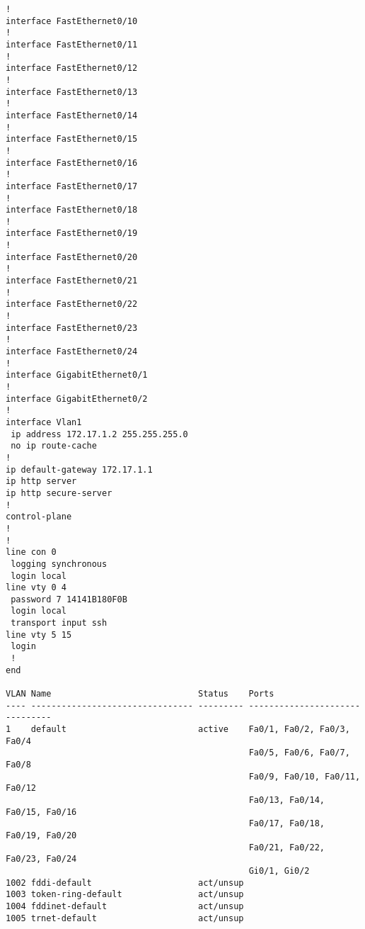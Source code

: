 \begin{Verbatim}[frame=topline, framesep=4mm, label=\fbox{Minimal Switchconfig}]
!
interface FastEthernet0/10
!
interface FastEthernet0/11
!
interface FastEthernet0/12
!
interface FastEthernet0/13
!
interface FastEthernet0/14
!
interface FastEthernet0/15
!
interface FastEthernet0/16
!
interface FastEthernet0/17
!
interface FastEthernet0/18
!
interface FastEthernet0/19
!
interface FastEthernet0/20
!
interface FastEthernet0/21
!
interface FastEthernet0/22
!
interface FastEthernet0/23
!
interface FastEthernet0/24
!
interface GigabitEthernet0/1
!
interface GigabitEthernet0/2
!
interface Vlan1
 ip address 172.17.1.2 255.255.255.0
 no ip route-cache
!
ip default-gateway 172.17.1.1
ip http server
ip http secure-server
!
control-plane
!
!
line con 0
 logging synchronous
 login local
line vty 0 4
 password 7 14141B180F0B
 login local
 transport input ssh
line vty 5 15
 login
 !
end

VLAN Name                             Status    Ports
---- -------------------------------- --------- -------------------------------
1    default                          active    Fa0/1, Fa0/2, Fa0/3, Fa0/4
                                                Fa0/5, Fa0/6, Fa0/7, Fa0/8
                                                Fa0/9, Fa0/10, Fa0/11, Fa0/12
                                                Fa0/13, Fa0/14, Fa0/15, Fa0/16
                                                Fa0/17, Fa0/18, Fa0/19, Fa0/20
                                                Fa0/21, Fa0/22, Fa0/23, Fa0/24
                                                Gi0/1, Gi0/2
1002 fddi-default                     act/unsup
1003 token-ring-default               act/unsup
1004 fddinet-default                  act/unsup
1005 trnet-default                    act/unsup 

\end{Verbatim}
